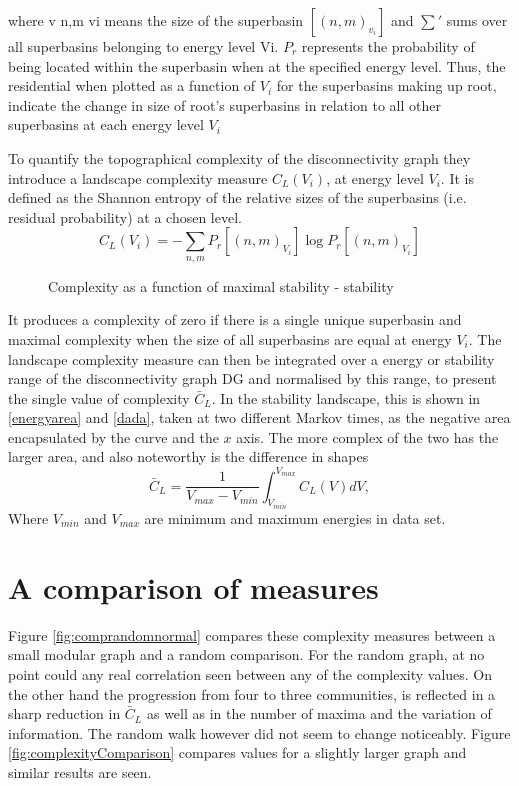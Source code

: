 where v n,m vi means the size of the superbasin $[(n,m)_{v_i}]$ and $\sum'$  sums over all superbasins belonging to energy level Vi.  $P_r$ represents the probability of being located within the superbasin when at the specified energy level.  Thus, the residential when plotted as a function of $V_i$ for the superbasins making up root, indicate the change in size of root’s superbasins in relation to all other superbasins at each energy level $V_i$ 


To quantify the topographical complexity of the disconnectivity graph they introduce a landscape complexity measure $C_L(V_i)$, at energy level $V_i$.  It is defined as the Shannon entropy of the relative sizes of the superbasins (i.e. residual probability) at a chosen level.
\[
C_L(V_i)=-\sum_{n,m}P_r [(n,m)_{V_i}] \log P_r [(n,m)_{V_i}]
\]

\begin{figure}[h]
  \centering
  \caption[]%
  {Complexity as a function of maximal stability - stability}
\end{figure}

It produces a complexity of zero if there is a single unique superbasin and maximal complexity when the size of all superbasins are equal at energy $V_i$. The landscape complexity measure can then be integrated over a energy or stability range of the disconnectivity graph DG and normalised by this range, to present the single value of complexity $\bar{C}_L$.  In the stability landscape, this is shown in \ref{energyarea} and \ref{dada}, taken at two different Markov times, as the negative area encapsulated by the curve and the $x$ axis.  The more complex of the two has the larger area, and also noteworthy is the difference in shapes	
\[
\bar{C}_L = \frac{1}{V_{max} - V_{min}} \int_{V_{min}}^{V_{max}} C_L(V)dV,
\]
Where $V_{min}$ and $V_{max}$ are minimum and maximum energies in data set.
\section{A comparison of measures}
\label{sec:results}
Figure \ref{fig:comprandomnormal} compares these complexity measures between a small modular graph and a random comparison.  For the random graph, at no point could any real correlation seen between any of the complexity values.  On the other hand the progression from four to three communities, is reflected in a sharp reduction in $\bar{C}_L$ as well as in the number of maxima and the variation of information.  The random walk however did not seem to change noticeably.  Figure \ref{fig:complexityComparison} compares values for a slightly larger graph and similar results are seen.  


